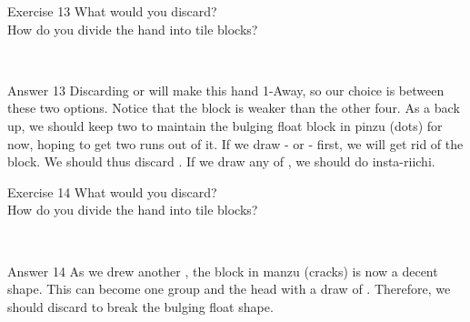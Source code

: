 \begin{itembox}[l]{Exercise 13}
What would you discard? \\
\vsp
How do you divide the hand into tile blocks? 

\vspace{-30pt}
\bp
{}\\ \vspace{-16pt}
\rfw{}
\ep
\end{itembox}

\newpage

\begin{itembox}[r]{Answer 13}
\emj
Discarding {\LARGE{}} or {\LARGE{}} will make this hand 1-Away, so our choice is between these two options. Notice that the {\LARGE{}} block is weaker than the other four. As a back up, we should keep two {\LARGE{}} to maintain the bulging float block in {\jap pinzu} (dots) for now, hoping to get two runs out of it. If we draw {\LARGE{}-} or {\LARGE{}-} first, we will get rid of the {\LARGE{}} block. We should thus discard {\LARGE{}}. If we draw any of {\LARGE{}}, we should do insta-riichi. 
\end{itembox}

\vfill

\begin{itembox}[l]{Exercise 14}
What would you discard? \\
\vsp
How do you divide the hand into tile blocks? 

\vspace{-30pt}
\bp
{}\\ \vspace{-16pt}
\rfw{}
\ep
\end{itembox}

\newpage

\begin{itembox}[r]{Answer 14}
\emj
As we drew another {\LARGE{}}, the block in {\jap manzu} (cracks) is now a decent shape. This can become one group and the head with a draw of {\LARGE{}   }. Therefore, we should discard  {\LARGE{}} to break the bulging float shape. 
\end{itembox}

